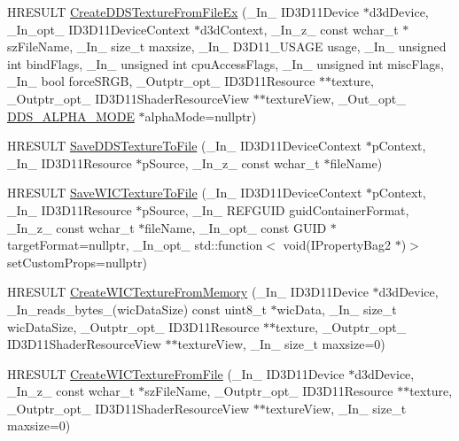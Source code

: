 \begin{DoxyCompactItemize}
\item 
H\+R\+E\+S\+U\+LT \mbox{\hyperlink{namespace_direct_x_a3fe71d8982208e409bf9ea67dcb11e99}{Create\+D\+D\+S\+Texture\+From\+File\+Ex}} (\+\_\+\+In\+\_\+ I\+D3\+D11\+Device $\ast$d3d\+Device, \+\_\+\+In\+\_\+opt\+\_\+ I\+D3\+D11\+Device\+Context $\ast$d3d\+Context, \+\_\+\+In\+\_\+z\+\_\+ const wchar\+\_\+t $\ast$sz\+File\+Name, \+\_\+\+In\+\_\+ size\+\_\+t maxsize, \+\_\+\+In\+\_\+ D3\+D11\+\_\+\+U\+S\+A\+GE usage, \+\_\+\+In\+\_\+ unsigned int bind\+Flags, \+\_\+\+In\+\_\+ unsigned int cpu\+Access\+Flags, \+\_\+\+In\+\_\+ unsigned int misc\+Flags, \+\_\+\+In\+\_\+ bool force\+S\+R\+GB, \+\_\+\+Outptr\+\_\+opt\+\_\+ I\+D3\+D11\+Resource $\ast$$\ast$texture, \+\_\+\+Outptr\+\_\+opt\+\_\+ I\+D3\+D11\+Shader\+Resource\+View $\ast$$\ast$texture\+View, \+\_\+\+Out\+\_\+opt\+\_\+ \mbox{\hyperlink{namespace_direct_x_a7cb48689d75471680c0bf7f79caaaf1f}{D\+D\+S\+\_\+\+A\+L\+P\+H\+A\+\_\+\+M\+O\+DE}} $\ast$alpha\+Mode=nullptr)
\item 
H\+R\+E\+S\+U\+LT \mbox{\hyperlink{namespace_direct_x_a461ef26b39c87e312275f261b4554b56}{Save\+D\+D\+S\+Texture\+To\+File}} (\+\_\+\+In\+\_\+ I\+D3\+D11\+Device\+Context $\ast$p\+Context, \+\_\+\+In\+\_\+ I\+D3\+D11\+Resource $\ast$p\+Source, \+\_\+\+In\+\_\+z\+\_\+ const wchar\+\_\+t $\ast$file\+Name)
\item 
H\+R\+E\+S\+U\+LT \mbox{\hyperlink{namespace_direct_x_adc9231b7aa4f629edf99f1d4177e6b15}{Save\+W\+I\+C\+Texture\+To\+File}} (\+\_\+\+In\+\_\+ I\+D3\+D11\+Device\+Context $\ast$p\+Context, \+\_\+\+In\+\_\+ I\+D3\+D11\+Resource $\ast$p\+Source, \+\_\+\+In\+\_\+ R\+E\+F\+G\+U\+ID guid\+Container\+Format, \+\_\+\+In\+\_\+z\+\_\+ const wchar\+\_\+t $\ast$file\+Name, \+\_\+\+In\+\_\+opt\+\_\+ const G\+U\+ID $\ast$target\+Format=nullptr, \+\_\+\+In\+\_\+opt\+\_\+ std\+::function$<$ void(I\+Property\+Bag2 $\ast$)$>$ set\+Custom\+Props=nullptr)
\item 
H\+R\+E\+S\+U\+LT \mbox{\hyperlink{namespace_direct_x_a3ce3ec875ba946920f2e8939915fd594}{Create\+W\+I\+C\+Texture\+From\+Memory}} (\+\_\+\+In\+\_\+ I\+D3\+D11\+Device $\ast$d3d\+Device, \+\_\+\+In\+\_\+reads\+\_\+bytes\+\_\+(wic\+Data\+Size) const uint8\+\_\+t $\ast$wic\+Data, \+\_\+\+In\+\_\+ size\+\_\+t wic\+Data\+Size, \+\_\+\+Outptr\+\_\+opt\+\_\+ I\+D3\+D11\+Resource $\ast$$\ast$texture, \+\_\+\+Outptr\+\_\+opt\+\_\+ I\+D3\+D11\+Shader\+Resource\+View $\ast$$\ast$texture\+View, \+\_\+\+In\+\_\+ size\+\_\+t maxsize=0)
\item 
H\+R\+E\+S\+U\+LT \mbox{\hyperlink{namespace_direct_x_a5fdba9031952424bfe7d31e0d859edd2}{Create\+W\+I\+C\+Texture\+From\+File}} (\+\_\+\+In\+\_\+ I\+D3\+D11\+Device $\ast$d3d\+Device, \+\_\+\+In\+\_\+z\+\_\+ const wchar\+\_\+t $\ast$sz\+File\+Name, \+\_\+\+Outptr\+\_\+opt\+\_\+ I\+D3\+D11\+Resource $\ast$$\ast$texture, \+\_\+\+Outptr\+\_\+opt\+\_\+ I\+D3\+D11\+Shader\+Resource\+View $\ast$$\ast$texture\+View, \+\_\+\+In\+\_\+ size\+\_\+t maxsize=0)

\end{DoxyCompactItemize}
